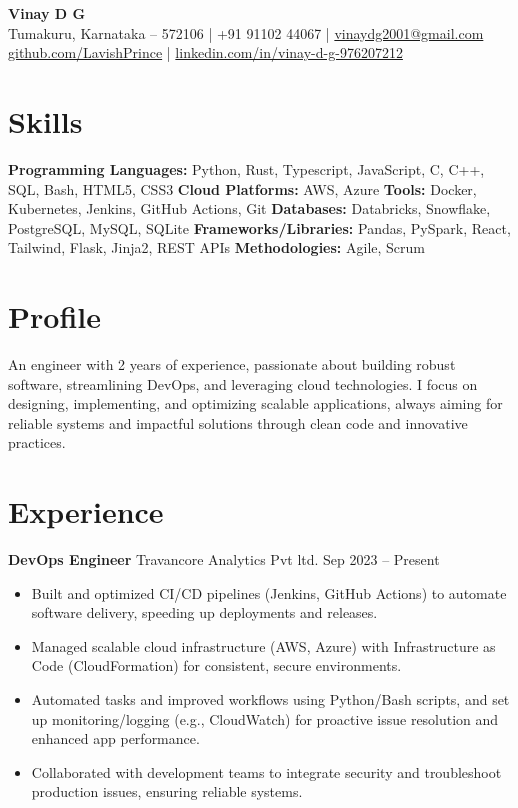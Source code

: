 \documentclass[a4paper]{article}
\begin{document}
\textbf{\Large Vinay D G} \\Tumakuru, Karnataka – 572106 \quad | \quad +91 91102 44067 \quad | \quad \href{mailto:vinaydg2001@gmail.com}{vinaydg2001@gmail.com} \\\href{https://github.com/LavishPrince}{github.com/LavishPrince} \quad | \quad \href{https://www.linkedin.com/in/vinay-d-g-976207212/}{linkedin.com/in/vinay-d-g-976207212}

\section*{Skills}
\textbf{Programming Languages:} Python, Rust, Typescript, JavaScript, C, C++, SQL, Bash, HTML5, CSS3
\textbf{Cloud Platforms:} AWS, Azure
\textbf{Tools:} Docker, Kubernetes, Jenkins, GitHub Actions, Git
\textbf{Databases:} Databricks, Snowflake, PostgreSQL, MySQL, SQLite
\textbf{Frameworks/Libraries:} Pandas, PySpark, React, Tailwind, Flask, Jinja2, REST APIs
\textbf{Methodologies:} Agile, Scrum

\section*{Profile}
An engineer with 2 years of experience, passionate about building robust software, streamlining DevOps, and leveraging cloud technologies. I focus on designing, implementing, and optimizing scalable applications, always aiming for reliable systems and impactful solutions through clean code and innovative practices.

\section*{Experience}
\begin{flushleft}
\textbf{DevOps Engineer} \quad Travancore Analytics Pvt ltd. \hfill Sep 2023 – Present
\end{flushleft}
\begin{itemize}[leftmargin=0.25in, label=\textbullet]
    \item Built and optimized CI/CD pipelines (Jenkins, GitHub Actions) to automate software delivery, speeding up deployments and releases.
    \item Managed scalable cloud infrastructure (AWS, Azure) with Infrastructure as Code (CloudFormation) for consistent, secure environments.
    \item Automated tasks and improved workflows using Python/Bash scripts, and set up monitoring/logging (e.g., CloudWatch) for proactive issue resolution and enhanced app performance.
    \item Collaborated with development teams to integrate security and troubleshoot production issues, ensuring reliable systems.
\end{itemize}
\end{document}
